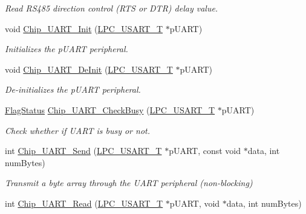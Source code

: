 \begin{DoxyCompactItemize}
\begin{DoxyCompactList}\small\item\em Read R\+S485 direction control (R\+TS or D\+TR) delay value. \end{DoxyCompactList}\item 
void \hyperlink{group___u_a_r_t__18_x_x__43_x_x_gaf024084be4068e407aab7c30e105f7af}{Chip\+\_\+\+U\+A\+R\+T\+\_\+\+Init} (\hyperlink{struct_l_p_c___u_s_a_r_t___t}{L\+P\+C\+\_\+\+U\+S\+A\+R\+T\+\_\+T} $\ast$p\+U\+A\+RT)
\begin{DoxyCompactList}\small\item\em Initializes the p\+U\+A\+RT peripheral. \end{DoxyCompactList}\item 
void \hyperlink{group___u_a_r_t__18_x_x__43_x_x_gaa18c4ebd4be27643e6f848472e778989}{Chip\+\_\+\+U\+A\+R\+T\+\_\+\+De\+Init} (\hyperlink{struct_l_p_c___u_s_a_r_t___t}{L\+P\+C\+\_\+\+U\+S\+A\+R\+T\+\_\+T} $\ast$p\+U\+A\+RT)
\begin{DoxyCompactList}\small\item\em De-\/initializes the p\+U\+A\+RT peripheral. \end{DoxyCompactList}\item 
\hyperlink{group___l_p_c___types___public___types_ga89136caac2e14c55151f527ac02daaff}{Flag\+Status} \hyperlink{group___u_a_r_t__18_x_x__43_x_x_ga1b5b93f60a5b0a28e5af5f3f3311bcba}{Chip\+\_\+\+U\+A\+R\+T\+\_\+\+Check\+Busy} (\hyperlink{struct_l_p_c___u_s_a_r_t___t}{L\+P\+C\+\_\+\+U\+S\+A\+R\+T\+\_\+T} $\ast$p\+U\+A\+RT)
\begin{DoxyCompactList}\small\item\em Check whether if U\+A\+RT is busy or not. \end{DoxyCompactList}\item 
int \hyperlink{group___u_a_r_t__18_x_x__43_x_x_gacbd726b1450510892272857e43854c4c}{Chip\+\_\+\+U\+A\+R\+T\+\_\+\+Send} (\hyperlink{struct_l_p_c___u_s_a_r_t___t}{L\+P\+C\+\_\+\+U\+S\+A\+R\+T\+\_\+T} $\ast$p\+U\+A\+RT, const void $\ast$data, int num\+Bytes)
\begin{DoxyCompactList}\small\item\em Transmit a byte array through the U\+A\+RT peripheral (non-\/blocking) \end{DoxyCompactList}\item 
int \hyperlink{group___u_a_r_t__18_x_x__43_x_x_ga06dd61ee7d8483847fea746978cb1c93}{Chip\+\_\+\+U\+A\+R\+T\+\_\+\+Read} (\hyperlink{struct_l_p_c___u_s_a_r_t___t}{L\+P\+C\+\_\+\+U\+S\+A\+R\+T\+\_\+T} $\ast$p\+U\+A\+RT, void $\ast$data, int num\+Bytes)

\end{DoxyCompactItemize}
